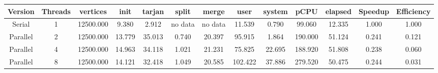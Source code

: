 \begin{tabular}{|c|c|c|c|c|c|c|c|c|c|c|c|c|}
\toprule
 Version &  Threads &  vertices &   init &  tarjan &   split &   merge &    user &  system &    pCPU &  elapsed &  Speedup &  Efficiency \\
\midrule
  Serial &        1 & 12500.000 &  9.380 &   2.912 & no data & no data &  11.539 &   0.790 &  99.060 &   12.335 &    1.000 &       1.000 \\
Parallel &        2 & 12500.000 & 13.779 &  35.013 &   0.740 &  20.397 &  95.915 &   1.864 & 190.000 &   51.124 &    0.241 &       0.121 \\
Parallel &        4 & 12500.000 & 14.963 &  34.118 &   1.021 &  21.231 &  75.825 &  22.695 & 188.920 &   51.808 &    0.238 &       0.060 \\
Parallel &        8 & 12500.000 & 14.121 &  32.418 &   1.049 &  20.585 & 102.422 &  37.886 & 279.520 &   50.475 &    0.244 &       0.031 \\
\bottomrule
\end{tabular}
